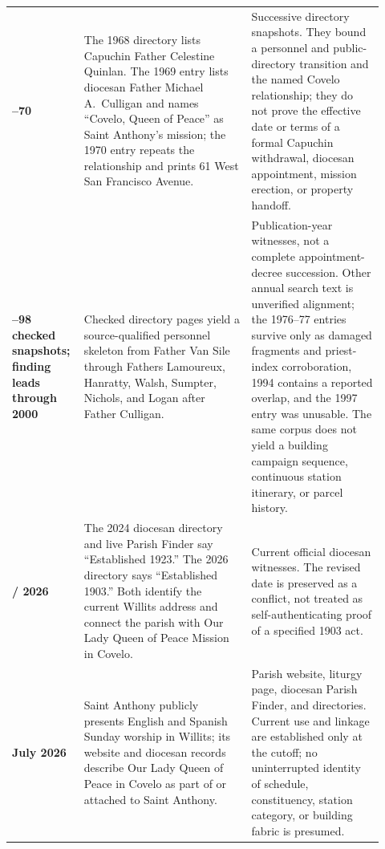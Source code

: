 \begin{longtable}{>{\bfseries\RaggedRight\arraybackslash}p{0.15\linewidth}>{\RaggedRight\arraybackslash}p{0.43\linewidth}>{\RaggedRight\arraybackslash}p{0.34\linewidth}}
1968--70 & The 1968 directory lists Capuchin Father Celestine Quinlan. The 1969 entry lists diocesan Father Michael A.~Culligan and names ``Covelo, Queen of Peace'' as Saint Anthony's mission; the 1970 entry repeats the relationship and prints 61 West San Francisco Avenue. & Successive directory snapshots. They bound a personnel and public-directory transition and the named Covelo relationship; they do not prove the effective date or terms of a formal Capuchin withdrawal, diocesan appointment, mission erection, or property handoff.\\

1974--98 checked snapshots; finding leads through 2000 & Checked directory pages yield a source-qualified personnel skeleton from Father Van Sile through Fathers Lamoureux, Hanratty, Walsh, Sumpter, Nichols, and Logan after Father Culligan. & Publication-year witnesses, not a complete appointment-decree succession. Other annual search text is unverified alignment; the 1976--77 entries survive only as damaged fragments and priest-index corroboration, 1994 contains a reported overlap, and the 1997 entry was unusable. The same corpus does not yield a building campaign sequence, continuous station itinerary, or parcel history.\\

2024 / 2026 & The 2024 diocesan directory and live Parish Finder say ``Established 1923.'' The 2026 directory says ``Established 1903.'' Both identify the current Willits address and connect the parish with Our Lady Queen of Peace Mission in Covelo. & Current official diocesan witnesses. The revised date is preserved as a conflict, not treated as self-authenticating proof of a specified 1903 act.\\

21 July 2026 & Saint Anthony publicly presents English and Spanish Sunday worship in Willits; its website and diocesan records describe Our Lady Queen of Peace in Covelo as part of or attached to Saint Anthony. & Parish website, liturgy page, diocesan Parish Finder, and directories. Current use and linkage are established only at the cutoff; no uninterrupted identity of schedule, constituency, station category, or building fabric is presumed.\\
\end{longtable}
